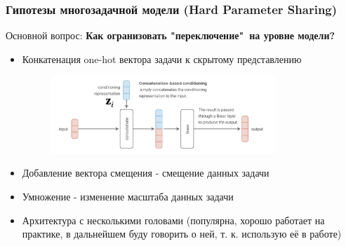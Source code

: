 \documentclass[aspectratio=169]{beamer}
\begin{document}
\begin{frame}
\frametitle{Гипотезы многозадачной модели (Hard Parameter Sharing)}
Основной вопрос: \textbf{Как огранизовать "переключение"\ на уровне модели?}
\begin{itemize}
	\item Конкатенация one-hot вектора задачи к скрытому представлению
	\begin{figure}
       	\includegraphics[width=0.8\textwidth]{assets/cat_based_cond.png}
    \end{figure}
	\item Добавление вектора смещения - смещение данных задачи
	\item Умножение - изменение масштаба данных задачи
	\item Архитектура с несколькими головами (популярна, хорошо работает на практике, в дальнейшем буду говорить о ней, т. к. использую её в работе)
\end{itemize}
\end{frame}
\end{document}

